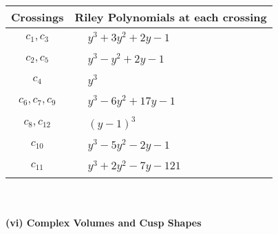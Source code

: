 \documentclass[1p]{elsarticle_modified}
\theoremstyle{definition}
\begin{document}
\begin{tabular}{m{50pt}|m{274pt}}
Crossings & \hspace{64pt}Riley Polynomials at each crossing \\
\hline $$\begin{aligned}c_{1},c_{3}\end{aligned}$$&$\begin{aligned}
&y^3+3 y^2+2 y-1
\end{aligned}$\\
\hline $$\begin{aligned}c_{2},c_{5}\end{aligned}$$&$\begin{aligned}
&y^3- y^2+2 y-1
\end{aligned}$\\
\hline $$\begin{aligned}c_{4}\end{aligned}$$&$\begin{aligned}
&y^3
\end{aligned}$\\
\hline $$\begin{aligned}c_{6},c_{7},c_{9}\end{aligned}$$&$\begin{aligned}
&y^3-6 y^2+17 y-1
\end{aligned}$\\
\hline $$\begin{aligned}c_{8},c_{12}\end{aligned}$$&$\begin{aligned}
&(y-1)^3
\end{aligned}$\\
\hline $$\begin{aligned}c_{10}\end{aligned}$$&$\begin{aligned}
&y^3-5 y^2-2 y-1
\end{aligned}$\\
\hline $$\begin{aligned}c_{11}\end{aligned}$$&$\begin{aligned}
&y^3+2 y^2-7 y-121
\end{aligned}$\\
\hline
\end{tabular}\\~\\
\newpage\flushleft \textbf{(vi) Complex Volumes and Cusp Shapes}
\end{document}
